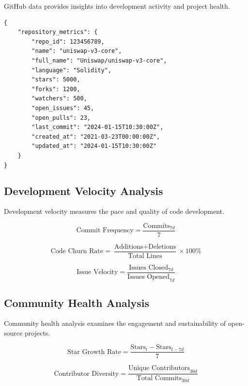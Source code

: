 \documentclass[12pt,a4paper]{article}
\begin{document}
GitHub data provides insights into development activity and project health.

\begin{lstlisting}
{
    "repository_metrics": {
        "repo_id": 123456789,
        "name": "uniswap-v3-core",
        "full_name": "Uniswap/uniswap-v3-core",
        "language": "Solidity",
        "stars": 5000,
        "forks": 1200,
        "watchers": 500,
        "open_issues": 45,
        "open_pulls": 23,
        "last_commit": "2024-01-15T10:30:00Z",
        "created_at": "2021-03-23T00:00:00Z",
        "updated_at": "2024-01-15T10:30:00Z"
    }
}
\end{lstlisting}

\subsection{Development Velocity Analysis}

Development velocity measures the pace and quality of code development.

\begin{equation}
\text{Commit Frequency} = \frac{\text{Commits}_{7d}}{7}
\end{equation}

\begin{equation}
\text{Code Churn Rate} = \frac{\text{Additions} + \text{Deletions}}{\text{Total Lines}} \times 100\%
\end{equation}

\begin{equation}
\text{Issue Velocity} = \frac{\text{Issues Closed}_{7d}}{\text{Issues Opened}_{7d}}
\end{equation}

\subsection{Community Health Analysis}

Community health analysis examines the engagement and sustainability of open-source projects.

\begin{equation}
\text{Star Growth Rate} = \frac{\text{Stars}_{t} - \text{Stars}_{t-7d}}{7}
\end{equation}

\begin{equation}
\text{Contributor Diversity} = \frac{\text{Unique Contributors}_{30d}}{\text{Total Commits}_{30d}}
\end{equation}
\end{document}
